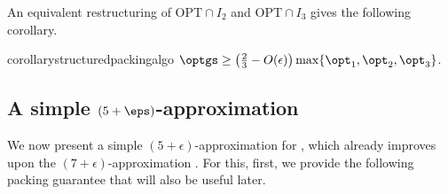 An equivalent restructuring of $\text{OPT}\cap I_2$ and $\text{OPT}\cap I_3$ gives the following corollary.

\begin{restatable}{corollary}{structuredpackingalgo}
\label{thm:structuredpackingalgo}
    $\optgs \ge \left(\frac{2}{3}-O(\epsilon)\right) \max\{\opt_1, \opt_2, \opt_3\}$.
\end{restatable}













\subsection{A simple \texorpdfstring{$(5+\eps)$}{5+ε}-approximation}
\label{sec:5approx}
We now present a simple $(5+\epsilon)$-approximation for \tdk, which already improves upon the $(7+\epsilon)$-approximation \cite{3d-knapsack}. For this, first, we provide the following packing guarantee that will also be useful later.

